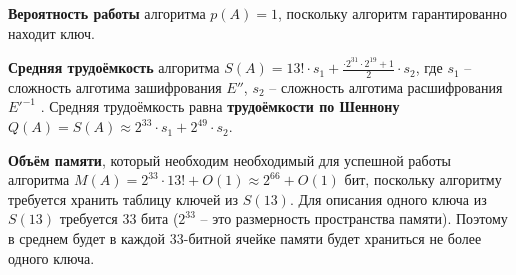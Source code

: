 \documentclass[a4paper,12pt]{article}
\theoremstyle{definition}
\begin{document}
	
	\textbf{Вероятность работы} алгоритма $p(A)=1$, поскольку алгоритм гарантированно находит ключ. 
	
	\textbf{Средняя трудоёмкость} алгоритма $S(A)= 13! \cdot s_1 + \frac{\cdot 2^{31} \cdot 2^{19} + 1}{2} \cdot s_2 $, где $s_1$ -- сложность алготима зашифрования $E''$, $s_2$ -- сложность алготима расшифрования $E'^{-1}$ . Средняя трудоёмкость равна \textbf{трудоёмкости по Шеннону} $Q(A) = S(A) \approx 2^{33} \cdot s_1 + 2^{49} \cdot s_2$.
	
	\textbf{Объём памяти}, который необходим необходимый для успешной работы алгоритма $M(A) = 2^{33} \cdot 13! + O(1) \approx 2^{66} + O(1)$ бит, поскольку алгоритму требуется хранить таблицу ключей из $S(13)$. Для описания одного ключа из $S(13)$ требуется 33 бита ($2^{33}$ -- это размерность пространства памяти). Поэтому в среднем будет в каждой 33-битной ячейке памяти будет храниться не более одного ключа. 
	
	
		
\end{document}
